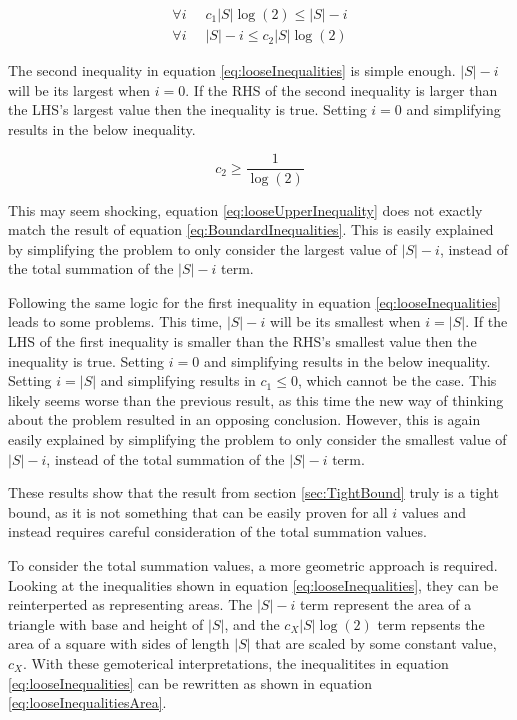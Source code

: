 \documentclass{article}
\begin{document}
\begin{equation}
	\begin{split}
		\forall i \;\; & c_1|S|\log(2)\le |S|-i \\
		\forall i \;\; & |S|-i\le c_2|S|\log(2)
	\end{split}
	\label{eq:looseInequalities}
\end{equation}

The second inequality in equation \ref{eq:looseInequalities} is simple enough. $|S|-i$ will be its largest when $i=0$. If the RHS of the second inequality is larger than the LHS's largest value then the inequality is true. Setting $i=0$ and simplifying results in the below inequality.

\begin{equation}
	c_2\ge \frac{1}{\log(2)}
	\label{eq:looseUpperInequality}
\end{equation}

This may seem shocking, equation \ref{eq:looseUpperInequality} does not exactly match the result of equation \ref{eq:BoundardInequalities}. This is easily explained by simplifying the problem to only consider the largest value of $|S|-i$, instead of the total summation of the $|S|-i$ term.

Following the same logic for the first inequality in equation \ref{eq:looseInequalities} leads to some problems. This time, $|S|-i$ will be its smallest when $i=|S|$. If the LHS of the first inequality is smaller than the RHS's smallest value then the inequality is true. Setting $i=0$ and simplifying results in the below inequality. Setting $i=|S|$ and simplifying results in $c_1\le0$, which cannot be the case. This likely seems worse than the previous result, as this time the new way of thinking about the problem resulted in an opposing conclusion. However, this is again easily explained by simplifying the problem to only consider the smallest value of $|S|-i$, instead of the total summation of the $|S|-i$ term.

These results show that the result from section \ref{sec:TightBound} truly is a tight bound, as it is not something that can be easily proven for all $i$ values and instead requires careful consideration of the total summation values.


To consider the total summation values, a more geometric approach is required. Looking at the inequalities shown in equation \ref{eq:looseInequalities}, they can be reinterperted as representing areas. The $|S|-i$ term represent the area of a triangle with base and height of $|S|$, and the $c_X|S|\log(2)$ term repsents the area of a square with sides of length $|S|$ that are scaled by some constant value, $c_X$. With these gemoterical interpretations, the inequalitites in equation \ref{eq:looseInequalities} can be rewritten as shown in equation \ref{eq:looseInequalitiesArea}.
\end{document}
